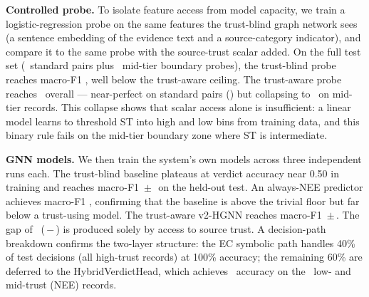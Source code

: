 \documentclass[11pt]{article}
\begin{document}
\textbf{Controlled probe.} To isolate feature access from model capacity, we train a logistic-regression probe on the same features the trust-blind graph network sees (a sentence embedding of the evidence text and a source-category indicator), and compare it to the same probe with the source-trust scalar added. On the full test set (\NStandard\ standard pairs plus \NMidTier\ mid-tier boundary probes), the trust-blind probe reaches macro-F1 \LogBlindMF, well below the trust-aware ceiling. The trust-aware probe reaches \LogAwareMF\ overall --- near-perfect on standard pairs (\LogAwareStd) but collapsing to \MidTierMF\ on mid-tier records. This collapse shows that scalar access alone is insufficient: a linear model learns to threshold ST into high and low bins from training data, and this binary rule fails on the mid-tier boundary zone where ST is intermediate.

\textbf{GNN models.} We then train the system's own models across three independent runs each. The trust-blind baseline plateaus at verdict accuracy near 0.50 in training and reaches macro-F1 \BaselineMF\,$\pm$\,\BaselineStd\ on the held-out test. An always-NEE predictor achieves macro-F1 \AlwaysNEEMF, confirming that the baseline is above the trivial floor but far below a trust-using model. The trust-aware v2-HGNN reaches macro-F1 \VtwoMF\,$\pm$\,\VtwoStd. The gap of \GapMF\ (\VtwoMF\,$-$\,\BaselineMF) is produced solely by access to source trust. A decision-path breakdown confirms the two-layer structure: the EC symbolic path handles 40\% of test decisions (all high-trust records) at 100\% accuracy; the remaining 60\% are deferred to the HybridVerdictHead, which achieves \VtwoVHAcc\ accuracy on the \VHTotal\ low- and mid-trust (NEE) records.
\end{document}
